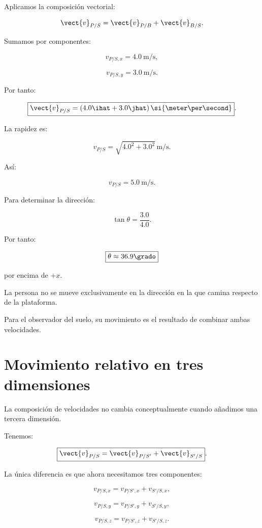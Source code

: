 Aplicamos la composición vectorial:

\[
\vect{v}_{P/S}
=
\vect{v}_{P/B}+\vect{v}_{B/S}.
\]

Sumamos por componentes:

\[
v_{P/S,x}=\SI{4.0}{\meter\per\second},
\]

\[
v_{P/S,y}=\SI{3.0}{\meter\per\second}.
\]

Por tanto:

\[
\boxed{
\vect{v}_{P/S}
=
(4.0\ihat+3.0\jhat)
\,\si{\meter\per\second}
}.
\]

La rapidez es:

\[
v_{P/S}
=
\sqrt{4.0^2+3.0^2}\,
\si{\meter\per\second}.
\]

Así:

\[
\boxed{
v_{P/S}=\SI{5.0}{\meter\per\second}
}.
\]

Para determinar la dirección:

\[
\tan\theta=\frac{3.0}{4.0}.
\]

Por tanto:

\[
\boxed{
\theta\approx36.9\grado
}
\]

por encima de \(+x\).

\begin{interpretacion}

La persona no se mueve exclusivamente en la dirección
en la que camina respecto de la plataforma.

Para el observador del suelo, su movimiento es el resultado
de combinar ambas velocidades.

\end{interpretacion}


\section{Movimiento relativo en tres dimensiones}

La composición de velocidades no cambia conceptualmente
cuando añadimos una tercera dimensión.

Tenemos:

\[
\boxed{
\vect{v}_{P/S}
=
\vect{v}_{P/S'}
+
\vect{v}_{S'/S}
}.
\]

La única diferencia es que ahora necesitamos tres componentes:

\[
\boxed{
v_{P/S,x}
=
v_{P/S',x}+v_{S'/S,x}
},
\]

\[
\boxed{
v_{P/S,y}
=
v_{P/S',y}+v_{S'/S,y}
},
\]

\[
\boxed{
v_{P/S,z}
=
v_{P/S',z}+v_{S'/S,z}
}.
\]

